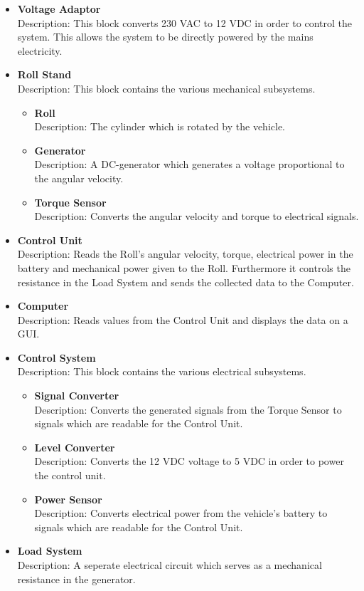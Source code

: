\begin{itemize}
	\item \textbf{Voltage Adaptor}\\
	Description: This block converts 230 VAC to 12 VDC in order to control the system. This allows the system to be directly powered by the mains electricity.
	\item \textbf{Roll Stand}\\
	Description: This block contains the various mechanical subsystems.
	\begin{itemize}
	   	\item \textbf{Roll}\\
	   	Description: The cylinder which is rotated by the vehicle.
	   	\item \textbf{Generator}\\
	   	Description: A DC-generator which generates a voltage proportional to the angular velocity.
	   	\item \textbf{Torque Sensor}\\
	   	Description: Converts the angular velocity and torque to electrical signals.
	\end{itemize}
	\item \textbf{Control Unit}\\
	Description: Reads the Roll's angular velocity, torque, electrical power in the battery and mechanical power given to the Roll. Furthermore it controls the resistance in the Load System and sends the collected data to the Computer.
	\item \textbf{Computer}\\
	Description: Reads values from the Control Unit and displays the data on a GUI.
	\item \textbf{Control System}\\
	Description: This block contains the various electrical subsystems.
	\begin{itemize}
		\item \textbf{Signal Converter}\\
		Description: Converts the generated signals from the Torque Sensor to signals which are readable for the Control Unit.
		\item \textbf{Level Converter}\\
		Description: Converts the 12 VDC voltage to 5 VDC in order to power the control unit.
		\item \textbf{Power Sensor}\\
		Description: Converts electrical power from the vehicle's battery to signals which are readable for the Control Unit.
	\end{itemize}
	\item \textbf{Load System}\\
	Description: A seperate electrical circuit which serves as a mechanical resistance in the generator.
\end{itemize}

